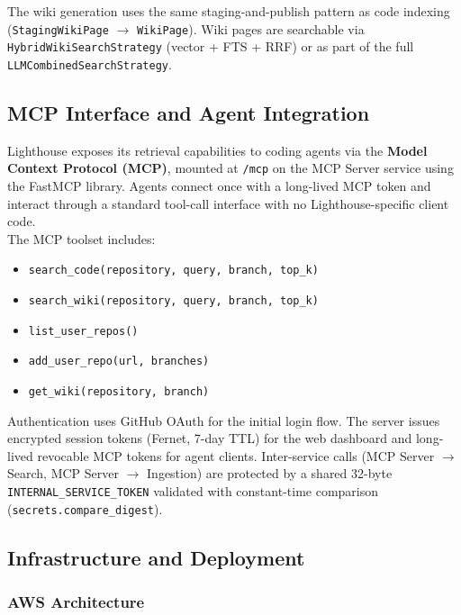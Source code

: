 \documentclass[a4paper,12pt]{article}
\begin{document}
The wiki generation uses the same staging-and-publish pattern as code
indexing (\texttt{StagingWikiPage} $\to$ \texttt{WikiPage}).
Wiki pages are searchable via \texttt{HybridWikiSearchStrategy} (vector +
FTS + RRF) or as part of the full \texttt{LLMCombinedSearchStrategy}.

\subsection{MCP Interface and Agent Integration}

Lighthouse exposes its retrieval capabilities to coding agents via the
\textbf{Model Context Protocol (MCP)}, mounted at \texttt{/mcp} on the MCP
Server service using the FastMCP library.
Agents connect once with a long-lived MCP token and interact through a
standard tool-call interface with no Lighthouse-specific client code.\\

The MCP toolset includes:
\begin{itemize}
  \item \texttt{search\_code(repository, query, branch, top\_k)}
  \item \texttt{search\_wiki(repository, query, branch, top\_k)}
  \item \texttt{list\_user\_repos()}
  \item \texttt{add\_user\_repo(url, branches)}
  \item \texttt{get\_wiki(repository, branch)}
\end{itemize}

Authentication uses GitHub OAuth for the initial login flow.
The server issues encrypted session tokens (Fernet, 7-day TTL) for the web
dashboard and long-lived revocable MCP tokens for agent clients.
Inter-service calls (MCP Server $\to$ Search, MCP Server $\to$ Ingestion) are
protected by a shared 32-byte \texttt{INTERNAL\_SERVICE\_TOKEN} validated
with constant-time comparison (\texttt{secrets.compare\_digest}).

\subsection{Infrastructure and Deployment}

\subsubsection{AWS Architecture}
\end{document}

